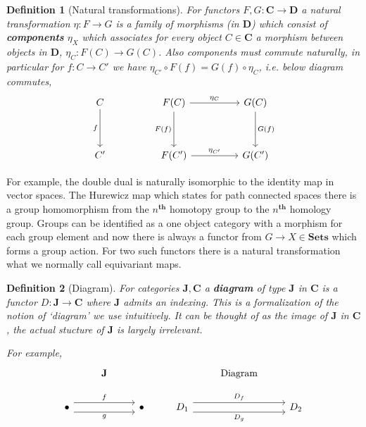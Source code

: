 \documentclass[12pt]{article}
\numberwithin{equation}{section}
\newtheorem{definition}{Definition}[section]
\begin{document}
\begin{appendices}
\begin{definition}[Natural transformations]
			For functors $F,G: \mathbf{C} \to \mathbf{D}$ a natural transformation $\eta: F \to G$ is a family of morphisms (in $\mathbf{D}$) which consist of \textbf{components} $\eta_X	$ which associates for every object $C \in \mathbf{C} $ a morphism between objects in $\mathbf{D}$, $\eta_C:F(C)\to G(C)$. Also components must commute naturally, in particular for $f: C \to C' $ we have $\eta_{C'} \circ F(f)=G(f)\circ\eta_C$, i.e. below diagram commutes,
			\[\begin{tikzcd}
				C && {F(C)} && {G(C)} \\
				\\
				{C'} && {F(C')} && {G(C')}
				\arrow["{\eta_C}", from=1-3, to=1-5]
				\arrow["{\eta_{C'}}", from=3-3, to=3-5]
				\arrow["{F(f)}"', from=1-3, to=3-3]
				\arrow["{G(f)}", from=1-5, to=3-5]
				\arrow["f"', from=1-1, to=3-1]
			\end{tikzcd}\]
		\end{definition}
		For example, the double dual is naturally isomorphic to the identity map in vector spaces. The Hurewicz map which states for path connected spaces there is a group homomorphism from the $n^{\textbf{th}}$ homotopy group to the $n^{\textbf{th}}$ homology group. Groups can be identified as a one object category with a morphism for each group element and now there is always a functor from $G \to X \in \mathbf{Sets}$ which forms a group action. For two such functors there is a natural transformation what we normally call equivariant maps.
		
		\begin{definition}[Diagram]
			For categories $\mathbf{J}, \mathbf{C}$ a \textbf{diagram} of type $\mathbf{J}$ in $\mathbf{C}$ is a functor $D: \mathbf{J} \to \mathbf{C}$ where $\mathbf J$ admits an indexing. This is a formalization of the notion of `diagram' we use intuitively. It can be thought of as the image of $\mathbf J$ in $\mathbf C$, the actual stucture of $\mathbf J$ is largely irrelevant.
			
			For example,
			\[\begin{tikzcd}
				& {\mathbf{J}} &&& {\text{Diagram}} \\
				\bullet && \bullet & {D_1} && {D_2}
				\arrow["f", shift left=2, from=2-1, to=2-3]
				\arrow["g"', shift right=2, from=2-1, to=2-3]
				\arrow["{D_f}", shift left=2, from=2-4, to=2-6]
				\arrow["{D_g}"', shift right=2, from=2-4, to=2-6]
			\end{tikzcd}\]
		\end{definition}
		

\end{appendices}
\end{document}
